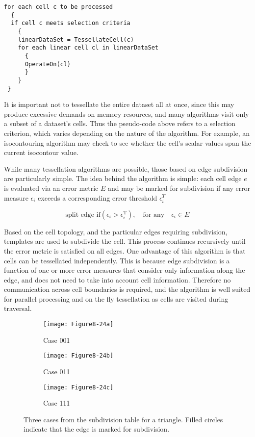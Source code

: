 \begin{lstlisting}[caption={}, numbers=none, frame=none]
for each cell c to be processed
  {
  if cell c meets selection criteria
    {
    linearDataSet = TessellateCell(c)
    for each linear cell cl in linearDataSet
      {
      OperateOn(cl)
      }
    }
 }
\end{lstlisting}

It is important not to tessellate the entire dataset all at once, since this may produce excessive demands on memory resources, and many algorithms visit only a subset of a dataset’s cells. Thus the pseudo-code above refers to a selection criterion, which varies depending on the nature of the algorithm. For example, an isocontouring algorithm may check to see whether the cell’s scalar values span the current isocontour value.

While many tessellation algorithms are possible, those based on edge subdivision are particularly simple. The idea behind the algorithm is simple: each cell edge $e$ is evaluated via an error metric $E$ and may be marked for subdivision if any error measure $\epsilon_i$ exceeds a corresponding error threshold $\epsilon_i^T$  

\begin{equation}\label{eq:8.7}
\text{split edge if} (\epsilon_i > \epsilon_i^{\text{T}}), \quad \text{for any} \quad \epsilon_i \in E
\end{equation}

Based on the cell topology, and the particular edges requiring subdivision, templates are used to subdivide the cell. This process continues recursively until the error metric is satisfied on all edges. One advantage of this algorithm is that cells can be tessellated independently. This is because edge subdivision is a function of one or more error measures that consider only information along the edge, and does not need to take into account cell information. Therefore no communication across cell boundaries is required, and the algorithm is well suited for parallel processing and on the fly tessellation as cells are visited during traversal.

\begin{figure}[!htb]
    \centering
    \begin{subfigure}{0.32\linewidth}
        \centering
        \texttt{[image: Figure8-24a]}
        \caption{Case 001}\label{fig:Figure8-24a}
    \end{subfigure}
    \hfill
    \begin{subfigure}{0.32\linewidth}
        \centering
        \texttt{[image: Figure8-24b]}
        \caption{Case 011}\label{fig:Figure8-24b}
    \end{subfigure}%
    \hfill
    \begin{subfigure}{0.32\linewidth}
        \centering
        \texttt{[image: Figure8-24c]}
        \caption{Case 111}\label{fig:Figure8-24c}
    \end{subfigure}%
    \caption{Three cases from the subdivision table for a triangle. Filled circles indicate that the edge is marked for subdivision.}
    \label{fig:Figure8-24}
\end{figure}


